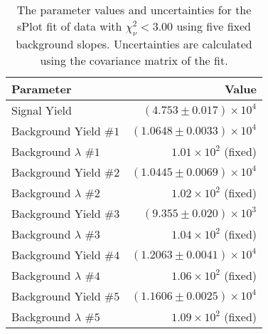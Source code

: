 
\begin{table}[ht]
    \begin{center}
        \begin{tabular}{lr}\toprule
            Parameter & Value \\\midrule
            Signal Yield & $(4.753 \pm 0.017) \times 10^{4}$ \\
            Background Yield $\#1$ & $(1.0648 \pm 0.0033) \times 10^{4}$ \\
            Background $\lambda$ $\#1$ & $1.01 \times 10^{2}$ (fixed) \\
            Background Yield $\#2$ & $(1.0445 \pm 0.0069) \times 10^{4}$ \\
            Background $\lambda$ $\#2$ & $1.02 \times 10^{2}$ (fixed) \\
            Background Yield $\#3$ & $(9.355 \pm 0.020) \times 10^{3}$ \\
            Background $\lambda$ $\#3$ & $1.04 \times 10^{2}$ (fixed) \\
            Background Yield $\#4$ & $(1.2063 \pm 0.0041) \times 10^{4}$ \\
            Background $\lambda$ $\#4$ & $1.06 \times 10^{2}$ (fixed) \\
            Background Yield $\#5$ & $(1.1606 \pm 0.0025) \times 10^{4}$ \\
            Background $\lambda$ $\#5$ & $1.09 \times 10^{2}$ (fixed) \\\bottomrule
        \end{tabular}
        \caption{The parameter values and uncertainties for the sPlot fit of data with $\chi^2_\nu < 3.00$ using five fixed background slopes. Uncertainties are calculated using the covariance matrix of the fit.}\label{tab:splot-fit-results-chisqdof-3.00-fixed-5}
    \end{center}
\end{table}
